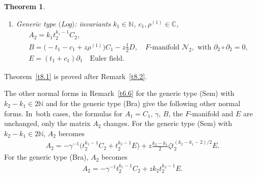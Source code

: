 \documentclass[10pt,a4paper]{amsart}
\numberwithin{equation}{section}
\numberwithin{figure}{section}
\newcommand{\N}{{\mathbb N}}
\newcommand{\C}{{\mathbb C}}
\newcommand{\NN}{{\mathcal N}}
\newcommand{\paa}{\partial}
\newtheorem{Theorem}{Theorem}[section]
\begin{document}
\begin{Theorem}
\begin{enumerate}
\begin{enumerate}
\item[$(iv)$] Generic type $($Log$)$:
invariants $k_1\in\N$,
$c_1,\rho^{(1)}\in\C$,
\begin{gather*}%
A_2=k_1t_2^{k_1-1}C_2,
\\
B= \big({-}t_1-c_1+z\rho^{(1)}\big)C_1-z\frac{1}{2} D,
\quad
\text{$F$-manifold }\NN_2,
\text{ with }\paa_2\circ\paa_2=0,\\
E= (t_1+c_1)\paa_1 \quad\text{Euler field}.
\end{gather*}
\end{enumerate}
\end{enumerate}
\end{Theorem}


Theorem~\ref{t8.1} is proved after Remark~\ref{t8.2}.

\begin{Remark}\label{t8.2}
The other normal forms in Remark~\ref{t6.6} for
the generic type (Sem) with $k_2-k_1\in 2\N$ and for the
generic type (Bra) give the following other normal
forms. In~both cases, the formulas for $A_1=C_1$,
$\gamma$, $B$, the $F$-manifold and $E$ are unchanged,
only the matrix $A_2$ changes.
For the generic type (Sem) with $k_2-k_1\in 2\N$, $A_2$ becomes
\begin{gather*}%
A_2=-\gamma^{-1}\big(t_2^{k_1-1}C_2+t_2^{k_2-1}E\big) +
z\frac{k_2-k_1}{2}\zeta t_2^{(k_2-k_1-2)/2}E.
\end{gather*}
For the generic type (Bra), $A_2$ becomes
\begin{gather*}%
A_2=-\gamma^{-1}t_2^{k_1-1}C_2+zk_2t_2^{k_2-1}E .
\end{gather*}
\end{Remark}
\end{document}
